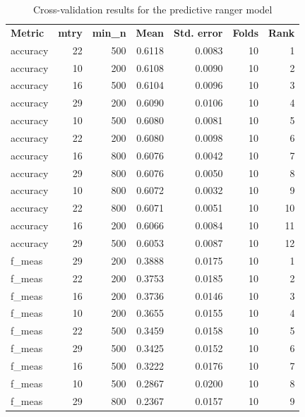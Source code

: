 \documentclass[
  11pt,
  a4paper,
]{article}
\begin{document}
\endgroup{}

\begingroup\fontsize{11}{13}\selectfont

\begin{longtable}[t]{>{\raggedleft\arraybackslash}p{2.4cm}rrrrrr}

\caption{\label{tbl-appendix-ranger-cross-validation}Cross-validation
results for the predictive ranger model}

\tabularnewline

\\
\toprule
\textbf{Metric} & \textbf{mtry} & \textbf{min\_n} & \textbf{Mean} & \textbf{Std. error} & \textbf{Folds} & \textbf{Rank}\\
\midrule
accuracy & 22 & 500 & 0.6118 & 0.0083 & 10 & 1\\
accuracy & 10 & 200 & 0.6108 & 0.0090 & 10 & 2\\
accuracy & 16 & 500 & 0.6104 & 0.0096 & 10 & 3\\
accuracy & 29 & 200 & 0.6090 & 0.0106 & 10 & 4\\
accuracy & 10 & 500 & 0.6080 & 0.0081 & 10 & 5\\
\addlinespace
accuracy & 22 & 200 & 0.6080 & 0.0098 & 10 & 6\\
accuracy & 16 & 800 & 0.6076 & 0.0042 & 10 & 7\\
accuracy & 29 & 800 & 0.6076 & 0.0050 & 10 & 8\\
accuracy & 10 & 800 & 0.6072 & 0.0032 & 10 & 9\\
accuracy & 22 & 800 & 0.6071 & 0.0051 & 10 & 10\\
\addlinespace
accuracy & 16 & 200 & 0.6066 & 0.0084 & 10 & 11\\
accuracy & 29 & 500 & 0.6053 & 0.0087 & 10 & 12\\
f\_meas & 29 & 200 & 0.3888 & 0.0175 & 10 & 1\\
f\_meas & 22 & 200 & 0.3753 & 0.0185 & 10 & 2\\
f\_meas & 16 & 200 & 0.3736 & 0.0146 & 10 & 3\\
\addlinespace
f\_meas & 10 & 200 & 0.3655 & 0.0155 & 10 & 4\\
f\_meas & 22 & 500 & 0.3459 & 0.0158 & 10 & 5\\
f\_meas & 29 & 500 & 0.3425 & 0.0152 & 10 & 6\\
f\_meas & 16 & 500 & 0.3222 & 0.0176 & 10 & 7\\
f\_meas & 10 & 500 & 0.2867 & 0.0200 & 10 & 8\\
\addlinespace
f\_meas & 29 & 800 & 0.2367 & 0.0157 & 10 & 9\\

\end{longtable}
\end{document}

